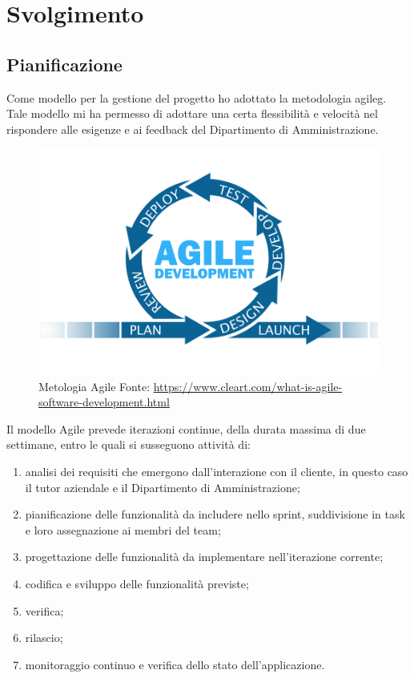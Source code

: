 
\chapter{Svolgimento}
\label{cap:svolgimento}


\section{Pianificazione}
	Come modello per la gestione del progetto ho adottato la metodologia \gls{agileg}. Tale
	modello mi ha permesso di adottare una certa flessibilità e velocità nel rispondere alle
	esigenze e ai feedback del Dipartimento di Amministrazione.
	
	\begin{figure}[ht]
		\centering
		\includegraphics[width=0.7\linewidth]{immagini/agile}
		\caption{Metologia Agile \newline  Fonte: \url{https://www.cleart.com/what-is-agile-software-development.html}}
		\label{fig:agile}
	\end{figure}
	
	Il modello Agile prevede iterazioni continue, della durata massima di due settimane,
	entro le quali si susseguono attività di:
	\begin{enumerate}
		\item analisi dei requisiti che emergono dall’interazione con il cliente, in questo caso il tutor aziendale e il Dipartimento di Amministrazione;
		\item pianificazione delle funzionalità da includere nello sprint, suddivisione in task e loro assegnazione ai membri del team;
		\item progettazione delle funzionalità da implementare nell’iterazione corrente;
		\item codifica e sviluppo delle funzionalità previste;
		\item verifica;
		\item rilascio;
		\item monitoraggio continuo e verifica dello stato dell’applicazione.
	\end{enumerate}
		
